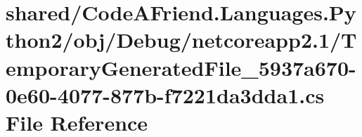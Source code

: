 \hypertarget{shared_2_code_a_friend_8_languages_8_python2_2obj_2_debug_2netcoreapp2_81_2_temporary_generated_e394b2ea6de749c583bf159973ff4a06}{}\section{shared/\+Code\+A\+Friend.Languages.\+Python2/obj/\+Debug/netcoreapp2.1/\+Temporary\+Generated\+File\+\_\+5937a670-\/0e60-\/4077-\/877b-\/f7221da3dda1.cs File Reference}
\label{shared_2_code_a_friend_8_languages_8_python2_2obj_2_debug_2netcoreapp2_81_2_temporary_generated_e394b2ea6de749c583bf159973ff4a06}
